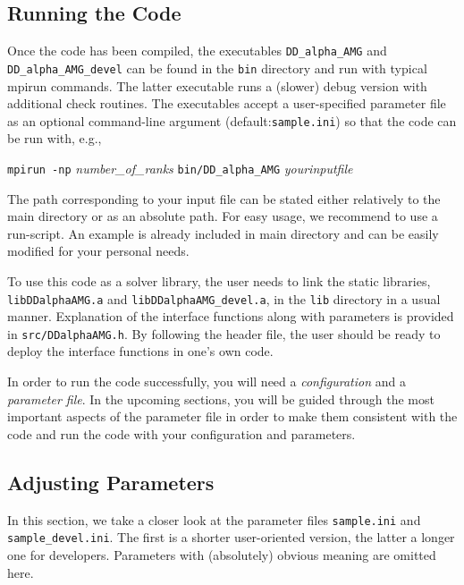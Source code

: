 \documentclass[a4paper,12pt]{scrartcl}
\begin{document}
\subsection{Running the Code}\label{run_wilson:ss}
Once the code has been compiled, the executables \texttt{DD\_alpha\_AMG} and \texttt{DD\_alpha\_AMG\_devel} can be found in the \texttt{bin} directory and run with typical mpirun commands. The latter executable runs a (slower) debug version with additional check routines. The executables accept a user-specified parameter file as an optional command-line argument (default:\texttt{sample.ini}) so that the code can be run with, e.g.,
\begin{center}
\texttt{mpirun -np} \textit{number\_of\_ranks} \texttt{bin/DD\_alpha\_AMG} \textit{yourinputfile}
\end{center}
The path corresponding to your input file can be stated either relatively to the main directory or as an absolute path. For easy usage, we recommend to use a run-script. An example is already included in main directory and can be easily modified for your personal needs.

To use this code as a solver library, the user needs to link the static libraries, \texttt{libDDalphaAMG.a} and \texttt{libDDalphaAMG\_devel.a}, in the \texttt{lib} directory in a usual manner.  Explanation of the interface functions along with parameters is provided in \texttt{src/DDalphaAMG.h}.  By following the header file, the user should be ready to deploy the interface functions in one's own code.

In order to run the code successfully, you will need a \textit{configuration} and a \textit{parameter file}. In the upcoming sections, you will be guided through the most important aspects of the parameter file in order to make them consistent with the code and run the code with your configuration and parameters.

\subsection{Adjusting Parameters}\label{param_wilson:ss}
In this section, we take a closer look at the parameter files \texttt{sample.ini} and \texttt{sample\_devel.ini}. The first is a shorter user-oriented version, the latter a longer one for developers. Parameters with (absolutely) obvious meaning are omitted here.
\end{document}

